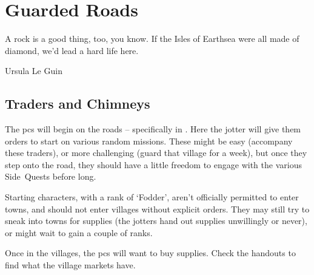 \chapter{Guarded Roads}
\epigraph{A rock is a good thing, too, you know. If the Isles of Earthsea were all made of diamond, we'd lead a hard life here.}{Ursula Le Guin}

\section{Traders and Chimneys}

The \glspl{pc} will begin on the roads -- specifically in .
Here the \gls{jotter} will give them orders to start on various random missions.%
These might be easy (accompany these traders), or more challenging (guard that \gls{village} for a week), but once they step onto the road, they should have a little freedom to engage with the various Side~Quests before long.

Starting characters, with a rank of `Fodder',%
aren't officially permitted to enter towns, and should not enter \glspl{village} without explicit orders.
They may still try to sneak into towns for supplies (the \glspl{jotter} hand out supplies unwillingly or never), or might wait to gain a couple of ranks.

Once in the \glspl{village}, the \glspl{pc} will want to buy supplies.
Check the handouts to find what the \gls{village} markets have.

